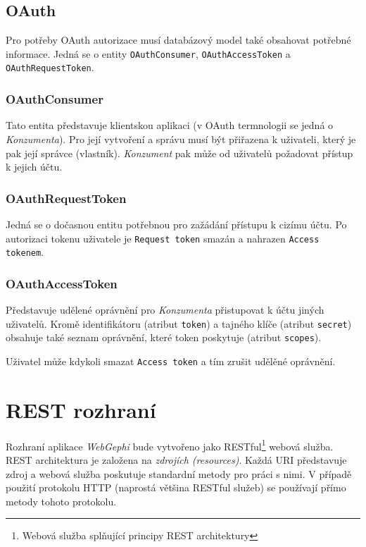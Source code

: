 \documentclass[thesis=M,czech]{FITthesis}[2014/05/6]
\begin{document}
\subsection{OAuth}
Pro potřeby OAuth autorizace musí databázový model také obsahovat potřebné informace. Jedná se o entity \texttt{OAuthConsumer}, \texttt{OAuthAccessToken} a \texttt{OAuthRequestToken}.

\subsubsection{OAuthConsumer}
Tato entita představuje klientskou aplikaci (v OAuth termnologii se jedná o \textit{Konzumenta}). Pro její vytvoření a správu musí být přiřazena k uživateli, který je pak její správce (vlastník).
\textit{Konzument} pak může od uživatelů požadovat přístup k jejich účtu.

\subsubsection{OAuthRequestToken}
Jedná se o dočasnou entitu potřebnou pro zažádání přístupu k cizímu účtu. Po autorizaci tokenu uživatele je \texttt{Request token} smazán a nahrazen \texttt{Access tokenem}.

\subsubsection{OAuthAccessToken}
Představuje udělené oprávnění pro \textit{Konzumenta} přistupovat k účtu jiných uživatelů. Kromě identifikátoru (atribut \texttt{token}) a tajného klíče (atribut \texttt{secret}) obsahuje také seznam
oprávnění, které token poskytuje (atribut \texttt{scopes}).

Uživatel může kdykoli smazat \texttt{Access token} a tím zrušit udělěné oprávnění.

\section{REST rozhraní}
Rozhraní aplikace \textit{WebGephi} bude vytvořeno jako RESTful\footnote{Webová služba splňující principy REST architektury} webová služba. REST architektura je 
založena na \textit{zdrojích (resources)}. Každá URI představuje zdroj a webová služba poskutuje standardní metody pro práci s nimi. V případě použití protokolu HTTP (naprostá většina RESTful služeb) se 
používají přímo metody tohoto protokolu.
\end{document}
